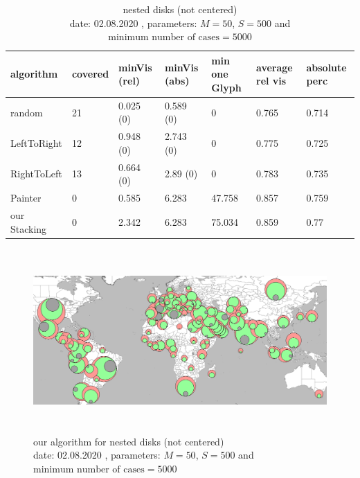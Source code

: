 \documentclass[a4paper,11pt]{article}
\begin{document}
\begin{table}[!h]
  \begin{center}
    \begin{tabular}{| l || p{1.3cm} | p{1.7cm} | p{1.7cm} | p{1.5cm} | p{1.5cm} | p{1.5cm} |}
      \hline
      algorithm    & covered & minVis (rel) & minVis (abs) & min one Glyph & average rel vis & absolute perc \\
      \hline
      random       & 21      & 0.025 (0)    & 0.589 (0)    & 0             & 0.765           & 0.714         \\

      LeftToRight  & 12      & 0.948 (0)    & 2.743 (0)    & 0             & 0.775           & 0.725         \\

      RightToLeft  & 13      & 0.664 (0)    & 2.89 (0)     & 0             & 0.783           & 0.735         \\

      Painter      & 0       & 0.585        & 6.283        & 47.758        & 0.857           & 0.759         \\

      our Stacking & 0       & 2.342        & 6.283        & 75.034        & 0.859           & 0.77          \\

      \hline
    \end{tabular}
  \end{center}
  \caption{nested disks (not centered)\\
    date: 02.08.2020  , parameters: $M=50$, $S=500$ and $\text{minimum number of cases}=5000$  }
\end{table}

\begin{figure}[!t]
  \centering
  \includegraphics[height=7cm]{assets/HawaiianEval}
  \caption{our algorithm for nested disks (not centered)\\
    date: 02.08.2020  , parameters: $M=50$, $S=500$ and $\text{minimum number of cases}=5000$  }
\end{figure}
\end{document}
